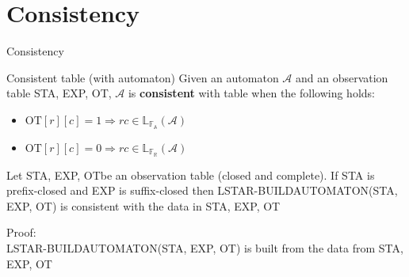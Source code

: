 \documentclass[aspectratio=169,xcolor=dvipsnames]{beamer}
\def\OT{\textlangle STA, EXP, OT\textrangle }
\begin{document}
\section{Consistency}
\begin{frame}[t]{Consistency}


\begin{block}{Consistent table (with automaton)}
Given an automaton $\mathcal{A}$ and an observation table \OT, $\mathcal{A}$ is \textbf{consistent} with table when the following holds:
\begin{itemize}
    \item $\text{OT}[r][c] = 1 \Longrightarrow rc \in \mathds{L}_{\mathds{F}_{\mathds{A}}} (\mathcal{A})$
    \item $\text{OT}[r][c] = 0 \Longrightarrow rc \in \mathds{L}_{\mathds{F}_{\mathds{R}}} (\mathcal{A})$
\end{itemize}
\end{block}

\begin{theorem}[Consistency]
Let \OT be an observation table (closed and complete). If STA is prefix-closed and EXP is suffix-closed then LSTAR-BUILDAUTOMATON(\OT) is consistent with the data in
\OT
\end{theorem}

Proof: \\
LSTAR-BUILDAUTOMATON(\OT) is built from the data from
\OT \\

\vspace{-5mm}

\rightline{$\square$}

\end{frame}
\end{document}
